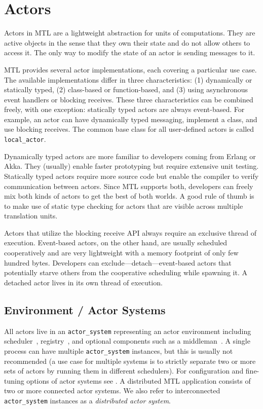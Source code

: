 \section{Actors}
\label{actor}

Actors in MTL are a lightweight abstraction for units of computations. They
are active objects in the sense that they own their state and do not allow
others to access it. The only way to modify the state of an actor is sending
messages to it.

MTL provides several actor implementations, each covering a particular use
case. The available implementations differ in three characteristics: (1)
dynamically or statically typed, (2) class-based or function-based, and (3)
using asynchronous event handlers or blocking receives. These three
characteristics can be combined freely, with one exception: statically typed
actors are always event-based. For example, an actor can have dynamically typed
messaging, implement a class, and use blocking receives. The common base class
for all user-defined actors is called \lstinline^local_actor^.

Dynamically typed actors are more familiar to developers coming from Erlang or
Akka. They (usually) enable faster prototyping but require extensive unit
testing. Statically typed actors require more source code but enable the
compiler to verify communication between actors. Since MTL supports both,
developers can freely mix both kinds of actors to get the best of both worlds.
A good rule of thumb is to make use of static type checking for actors that are
visible across multiple translation units.

Actors that utilize the blocking receive API always require an exclusive thread
of execution. Event-based actors, on the other hand, are usually scheduled
cooperatively and are very lightweight with a memory footprint of only few
hundred bytes. Developers can exclude---detach---event-based actors that
potentially starve others from the cooperative scheduling while spawning it. A
detached actor lives in its own thread of execution.

\subsection{Environment / Actor Systems}
\label{actor-system}

All actors live in an \lstinline^actor_system^ representing an actor
environment including scheduler~, registry~, and
optional components such as a middleman~. A single process can
have multiple \lstinline^actor_system^ instances, but this is usually not
recommended (a use case for multiple systems is to strictly separate two or
more sets of actors by running them in different schedulers). For configuration
and fine-tuning options of actor systems see . A
distributed MTL application consists of two or more connected actor systems. We
also refer to interconnected \lstinline^actor_system^ instances as a
\emph{distributed actor system}.

